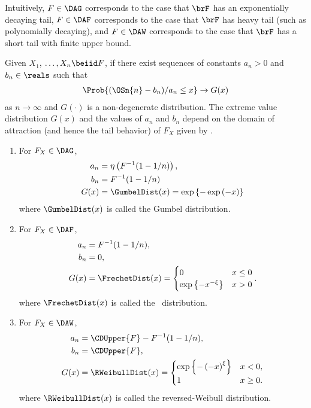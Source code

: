 Intuitively, 
$F \in \DAG$ corresponds to the case that $\brF$ has an exponentially decaying tail, 
$F \in \DAF$ corresponds to the case that $\brF$ has heavy tail (such as 
polynomially decaying), 
and 
$F \in \DAW$ corresponds to the case that $\brF$ has a short tail with finite
upper bound.

\begin{thm}
    \label{thm:ev_thm}
    Given $X_1$, $\ldots, X_n \allowbreak \beiid F$, if there exist sequences of constants
    $a_n>0 $ and $b_n\in \reals$ such that
    \begin{align}
        \label{eqn:ev_dist}
        \Prob{(\OSn{n}-b_n)/a_n \leq x} \rightarrow G(x)
    \end{align}
    as $n \rightarrow \infty$ and $G(\cdot)$ is a non-degenerate distribution. 
The extreme value distribution $G(x)$ and the values of  $a_n$ and $b_n$ depend on the domain of attraction (and
hence the tail behavior) of $F_X$ given by .
\begin{enumerate}
    \item For $F_X \in \DAG$,
        \begin{align}
            a_n &= \eta\left( F^{-1}(1-1/n) \right), \label{eqn:a_n_gumbel}\\
            b_n &= F^{-1}(1-1/n) \label{eqn:b_n_gumbel}\\
            G(x)& = \GumbelDist(x) = \exp\left\{-\exp\left(-x\right)\right\} \label{eqn:gumbel_law}
        \end{align}
        where $\GumbelDist(x)$ is called the {Gumbel distribution}.
    \item For $F_X \in \DAF$,
        \begin{align}
            a_n &= F^{-1}(1-1/n), \label{eqn:a_n_frechet} \\
            b_n &= 0, \label{eqn:b_n_frechet} \\
            G(x)  &= \FrechetDist(x) =\begin{cases} 
                0 & x \leq 0 \\ 
                \exp\left\{-x^{-\xi}\right\} & x > 0
            \end{cases}. \label{eqn:frechet_law}
        \end{align}
        where $\FrechetDist(x)$  is called the {\Frechet\ distribution}.
    \item For $F_X \in \DAW$,
        \begin{align}
            a_n &= \CDUpper{F} - F^{-1}(1-1/n),\\
            b_n &= \CDUpper{F}, \\
            G(x) &= \RWeibullDist(x) =\begin{cases} 
                \exp\left\{-\left( - x \right)^\xi\right\} & x<0, \\ 
                1 & x\geq 0.
            \end{cases}  \label{eqn:weibull_law}
        \end{align}
        where $\RWeibullDist(x)$ is called the {reversed-Weibull distribution}.
\end{enumerate}
\end{thm}
